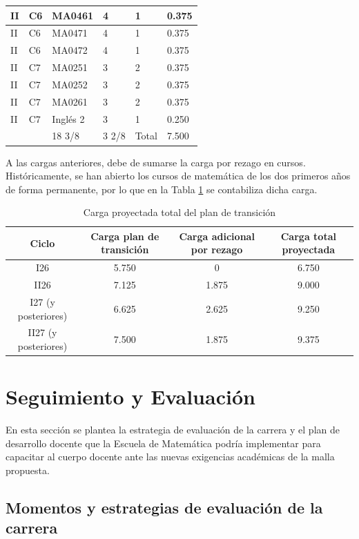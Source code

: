 \begin{longtable}[c]{|l|l|l|l|l|l|}
II & C6 & MA0461 & 4 & 1 & 0.375 \\ \hline
II & C6 & MA0471 & 4 & 1 & 0.375 \\ \hline
II & C6 & MA0472 & 4 & 1 & 0.375 \\ \hline
II & C7 & MA0251 & 3 & 2 & 0.375 \\ \hline
II & C7 & MA0252 & 3 & 2 & 0.375 \\ \hline
II & C7 & MA0261 & 3 & 2 & 0.375 \\ \hline
II & C7 & Inglés 2 & 3 & 1 & 0.250 \\ \hline
 &  & 18 3/8 & 3 2/8 & Total & 7.500 \\ \hline
\end{longtable}

A las cargas anteriores, debe de sumarse la carga por rezago en cursos. Históricamente, se han abierto los cursos de matemática de los dos primeros años de forma permanente, por lo que en la Tabla \ref{tab:resumenCarga} se contabiliza dicha carga.
\begin{longtable}[c]{|c|c|c|c|}
\caption{Carga proyectada total del plan de transición}
\label{tab:resumenCarga}\\
\hline
\rowcolor[HTML]{00C0F3}
Ciclo & Carga plan de transición & Carga adicional por rezago & Carga total proyectada \\ \hline
\endhead
%
I26 & 5.750 & 0 & 6.750 \\ \hline
II26 & 7.125 & 1.875 & 9.000 \\ \hline
I27 (y posteriores) & 6.625 & 2.625 & 9.250 \\ \hline
II27 (y posteriores) & 7.500 & 1.875 & 9.375 \\ \hline
\end{longtable}

\section{Seguimiento y Evaluación}

En esta sección se plantea la estrategia de evaluación de la carrera y el plan de desarrollo docente que la Escuela de Matemática podría implementar para capacitar al cuerpo docente ante las nuevas exigencias académicas de la malla propuesta.

\subsection{Momentos y estrategias de evaluación de la carrera}

